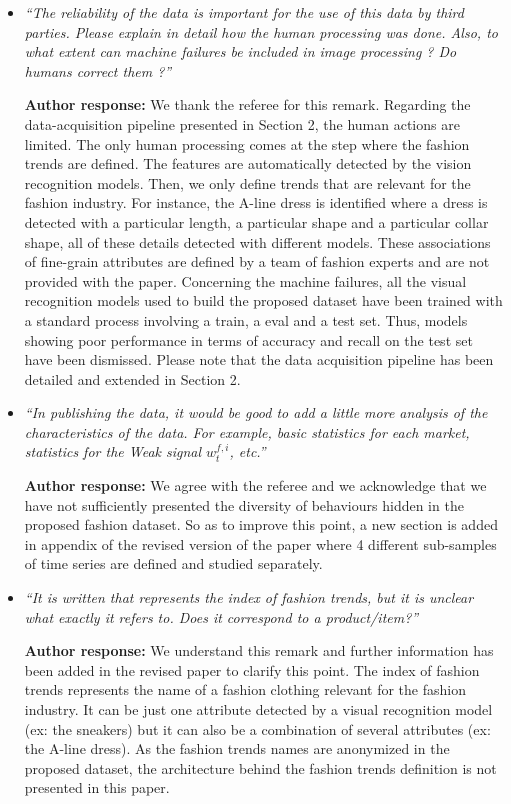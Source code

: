 \documentclass[10pt]{article} %
\begin{document}
\begin{itemize}
	\item {\em ``The reliability of the data is important for the use of this data by third parties. Please explain in detail how the human processing was done. Also, to what extent can machine failures be included in image processing ? Do humans correct them ?''} \medskip
	
	\textbf{Author response:} We thank the referee for this remark. Regarding the data-acquisition pipeline presented in Section 2, the human actions are limited. The only human processing comes at the step where the fashion trends are defined. The features are automatically detected by the vision recognition models. Then, we only define trends that are relevant for the fashion industry. For instance, the A-line dress is identified where a dress is detected with a particular length, a particular shape and a particular collar shape, all of these details detected with different models. These associations of fine-grain attributes are defined by a team of fashion experts and are not provided with the paper. 
Concerning the machine failures, all the visual recognition models used to build the proposed dataset have been trained with a standard process involving a train, a eval and a test set. Thus, models showing poor performance in terms of accuracy and recall on the test set have been dismissed. Please note that the data acquisition pipeline has been detailed and extended in Section 2. \\
	
	\item {\em ``In publishing the data, it would be good to add a little more analysis of the characteristics of the data. For example, basic statistics for each market, statistics for the Weak signal $w^{f,i}_t$, etc.''} \medskip
	
	\textbf{Author response:} We agree with the referee and we acknowledge that we have not sufficiently presented the diversity of behaviours hidden in the proposed fashion dataset. So as to improve this point, a new section is added in appendix of the revised version of the paper where 4 different sub-samples of time series are defined and studied separately. \\
	
	\item {\em ``It is written that represents the index of fashion trends, but it is unclear what exactly it refers to. Does it correspond to a product/item?''} \medskip

	\textbf{Author response:} We understand this remark and further information has been added in the revised paper to clarify this point. The index of fashion trends represents the name of a fashion clothing relevant for the fashion industry. It can be just one attribute detected by a visual recognition model (ex: the sneakers) but it can also be a combination of several attributes (ex: the A-line dress). As the fashion trends names are anonymized in the proposed dataset, the architecture behind the fashion trends definition is not presented in this paper.\\
	

\end{itemize}
\end{document}

